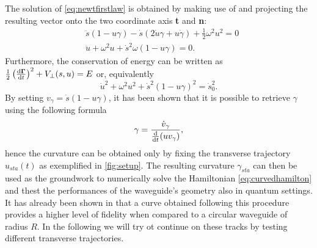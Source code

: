 The solution of \eqref{eq:newtfirstlaw} is obtained by making use of  and projecting the resulting vector onto the two coordinate axis \textbf{t} and \textbf{n}:
\begin{align}
	& \ddot{s} (1-u\gamma)  -\dot{s}(2\dot{u}\gamma + u \dot{\gamma}) + \frac{1}{2}\omega^2u^2 = 0 \\
	& \ddot{u} + \omega^2u + \dot{s}^2\omega(1-u\gamma)  = 0.
\end{align}
Furthermore, the conservation of energy can be written as $\frac{1}{2}\left(\diff{\Ga}{t}\right)^2 + V_\perp(s,u) = E$ or, equivalently
\begin{equation}
	\label{eq:energyconserve}
	\dot{u}^2 + \omega^2u^2 + \dot{s}^2(1-u\gamma)^2 = \dot{s}_0^2.
\end{equation}
By setting $ v_\gamma = \dot{s}(1-u\gamma)   $, it has been shown that it is possible to retrieve $ \gamma $ using the following formula
\begin{equation}
	\label{eq:stacurvature}
	\gamma = \frac{\dot{v}_\gamma}{\diff{}{t}(uv_\gamma)}	,
\end{equation}
hence the curvature can be obtained only by fixing the transverse trajectory $ u_{sta}(t) $ as exemplified in \cref{fig:setup}.
The resulting curvature $ \gamma_{sta} $ can then be used as the groundwork to numerically solve the Hamiltonian \eqref{eq:curvedhamilton} and thest the performances of the waveguide's geometry also in quantum settings.
It has already been shown in \cite{QuantumControlImpens2020} that a curve obtained following this procedure provides a higher level of fidelity when  compared to a circular waveguide of radius $R$.
In the following we will try ot continue on these tracks by testing different transverse trajectories.
